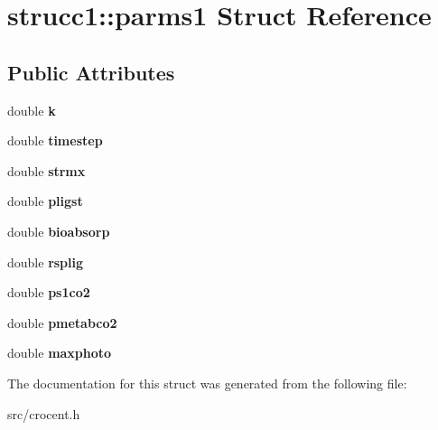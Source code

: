 \hypertarget{structstrucc1_1_1parms1}{\section{strucc1\-:\-:parms1 Struct Reference}
\label{structstrucc1_1_1parms1}
}
\subsection*{Public Attributes}
\begin{DoxyCompactItemize}
\item 
\hypertarget{structstrucc1_1_1parms1_ad98573677cfb9dd99d75d7e3a9b24447}{double {\bfseries k}}\label{structstrucc1_1_1parms1_ad98573677cfb9dd99d75d7e3a9b24447}

\item 
\hypertarget{structstrucc1_1_1parms1_a43df4da0b5c995ab15ae28ff808c699e}{double {\bfseries timestep}}\label{structstrucc1_1_1parms1_a43df4da0b5c995ab15ae28ff808c699e}

\item 
\hypertarget{structstrucc1_1_1parms1_ad060730bacb85e0fef4085c34ad4ec23}{double {\bfseries strmx}}\label{structstrucc1_1_1parms1_ad060730bacb85e0fef4085c34ad4ec23}

\item 
\hypertarget{structstrucc1_1_1parms1_a0ae369dc0b1fe998d577caf6e7aaa26a}{double {\bfseries pligst}}\label{structstrucc1_1_1parms1_a0ae369dc0b1fe998d577caf6e7aaa26a}

\item 
\hypertarget{structstrucc1_1_1parms1_a393040f0596716b30f61c4b4aaa84a93}{double {\bfseries bioabsorp}}\label{structstrucc1_1_1parms1_a393040f0596716b30f61c4b4aaa84a93}

\item 
\hypertarget{structstrucc1_1_1parms1_a024cd23006000492255f9ca4c094bebb}{double {\bfseries rsplig}}\label{structstrucc1_1_1parms1_a024cd23006000492255f9ca4c094bebb}

\item 
\hypertarget{structstrucc1_1_1parms1_a797e06c2e2872cd5d4017a8829d4f007}{double {\bfseries ps1co2}}\label{structstrucc1_1_1parms1_a797e06c2e2872cd5d4017a8829d4f007}

\item 
\hypertarget{structstrucc1_1_1parms1_ae6e7229392ecf3cf157800a3fe43c72e}{double {\bfseries pmetabco2}}\label{structstrucc1_1_1parms1_ae6e7229392ecf3cf157800a3fe43c72e}

\item 
\hypertarget{structstrucc1_1_1parms1_a14d7b10b335ce9c5f231d47464e4fd5d}{double {\bfseries maxphoto}}\label{structstrucc1_1_1parms1_a14d7b10b335ce9c5f231d47464e4fd5d}

\end{DoxyCompactItemize}


The documentation for this struct was generated from the following file\-:\begin{DoxyCompactItemize}
\item 
src/crocent.\-h\end{DoxyCompactItemize}

